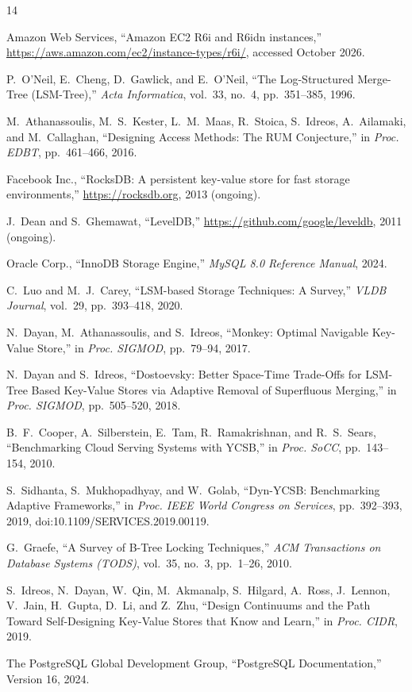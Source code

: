 \documentclass[10pt]{article}
\begin{document}
\begin{thebibliography}{14}

Amazon Web Services, ``Amazon EC2 R6i and R6idn instances,'' \url{https://aws.amazon.com/ec2/instance-types/r6i/}, accessed October 2026.

P.~O'Neil, E.~Cheng, D.~Gawlick, and E.~O'Neil, ``The Log-Structured Merge-Tree (LSM-Tree),'' \textit{Acta Informatica}, vol.~33, no.~4, pp.~351--385, 1996.

M.~Athanassoulis, M.~S.~Kester, L.~M.~Maas, R.~Stoica, S.~Idreos, A.~Ailamaki, and M.~Callaghan, ``Designing Access Methods: The RUM Conjecture,'' in \textit{Proc. EDBT}, pp.~461--466, 2016.

Facebook Inc., ``RocksDB: A persistent key-value store for fast storage environments,'' \url{https://rocksdb.org}, 2013 (ongoing).

J.~Dean and S.~Ghemawat, ``LevelDB,'' \url{https://github.com/google/leveldb}, 2011 (ongoing).

Oracle Corp., ``InnoDB Storage Engine,'' \textit{MySQL 8.0 Reference Manual}, 2024.

C.~Luo and M.~J.~Carey, ``LSM-based Storage Techniques: A Survey,'' \textit{VLDB Journal}, vol.~29, pp.~393--418, 2020.

N.~Dayan, M.~Athanassoulis, and S.~Idreos, ``Monkey: Optimal Navigable Key-Value Store,'' in \textit{Proc. SIGMOD}, pp.~79--94, 2017.

N.~Dayan and S.~Idreos, ``Dostoevsky: Better Space-Time Trade-Offs for LSM-Tree Based Key-Value Stores via Adaptive Removal of Superfluous Merging,'' in \textit{Proc. SIGMOD}, pp.~505--520, 2018.

B.~F.~Cooper, A.~Silberstein, E.~Tam, R.~Ramakrishnan, and R.~S.~Sears, ``Benchmarking Cloud Serving Systems with YCSB,'' in \textit{Proc. SoCC}, pp.~143--154, 2010.

S.~Sidhanta, S.~Mukhopadhyay, and W.~Golab, ``Dyn-YCSB: Benchmarking Adaptive Frameworks,'' in \textit{Proc. IEEE World Congress on Services}, pp.~392--393, 2019, doi:10.1109/SERVICES.2019.00119.

G.~Graefe, ``A Survey of B-Tree Locking Techniques,'' \textit{ACM Transactions on Database Systems (TODS)}, vol.~35, no.~3, pp.~1--26, 2010.

S.~Idreos, N.~Dayan, W.~Qin, M.~Akmanalp, S.~Hilgard, A.~Ross, J.~Lennon, V.~Jain, H.~Gupta, D.~Li, and Z.~Zhu, ``Design Continuums and the Path Toward Self-Designing Key-Value Stores that Know and Learn,'' in \textit{Proc. CIDR}, 2019.

The PostgreSQL Global Development Group, ``PostgreSQL Documentation,'' Version 16, 2024.

\end{thebibliography}
\end{document}
